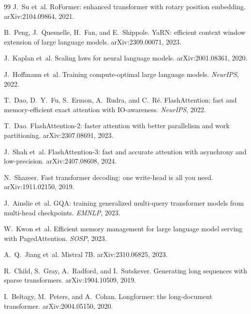 \begin{thebibliography}{99}
J.~Su et~al.
\newblock RoFormer: enhanced transformer with rotary position embedding.
\newblock arXiv:2104.09864, 2021.

B.~Peng, J.~Quesnelle, H.~Fan, and E.~Shippole.
\newblock YaRN: efficient context window extension of large language models.
\newblock arXiv:2309.00071, 2023.

J.~Kaplan et~al.
\newblock Scaling laws for neural language models.
\newblock arXiv:2001.08361, 2020.

J.~Hoffmann et~al.
\newblock Training compute-optimal large language models.
\newblock \emph{NeurIPS}, 2022.

T.~Dao, D.~Y.~Fu, S.~Ermon, A.~Rudra, and C.~R\'e.
\newblock FlashAttention: fast and memory-efficient exact attention with
  IO-awareness.
\newblock \emph{NeurIPS}, 2022.

T.~Dao.
\newblock FlashAttention-2: faster attention with better parallelism and
  work partitioning.
\newblock arXiv:2307.08691, 2023.

J.~Shah et~al.
\newblock FlashAttention-3: fast and accurate attention with asynchrony and
  low-precision.
\newblock arXiv:2407.08608, 2024.

N.~Shazeer.
\newblock Fast transformer decoding: one write-head is all you need.
\newblock arXiv:1911.02150, 2019.

J.~Ainslie et~al.
\newblock GQA: training generalized multi-query transformer models from
  multi-head checkpoints.
\newblock \emph{EMNLP}, 2023.

W.~Kwon et~al.
\newblock Efficient memory management for large language model serving with
  PagedAttention.
\newblock \emph{SOSP}, 2023.

A.~Q.~Jiang et~al.
\newblock Mistral 7B.
\newblock arXiv:2310.06825, 2023.

R.~Child, S.~Gray, A.~Radford, and I.~Sutskever.
\newblock Generating long sequences with sparse transformers.
\newblock arXiv:1904.10509, 2019.

I.~Beltagy, M.~Peters, and A.~Cohan.
\newblock Longformer: the long-document transformer.
\newblock arXiv:2004.05150, 2020.


\end{thebibliography}
